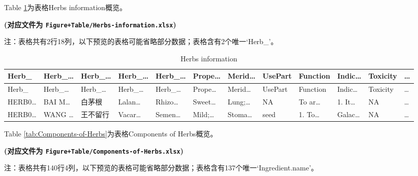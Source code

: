 \documentclass[
]{article}
\begin{document}
Table \ref{tab:Herbs-information}为表格Herbs information概览。

\textbf{(对应文件为 \texttt{Figure+Table/Herbs-information.xlsx})}

\begin{center}\begin{tcolorbox}[colback=gray!10, colframe=gray!50, width=0.9\linewidth, arc=1mm, boxrule=0.5pt]注：表格共有2行18列，以下预览的表格可能省略部分数据；表格含有2个唯一`Herb\_'。
\end{tcolorbox}
\end{center}

\begin{longtable}[]{@{}llllllllllll@{}}
\caption{\label{tab:Herbs-information}Herbs information}\tabularnewline
\toprule
Herb\_ & Herb\_\ldots{} & Herb\_\ldots{} & Herb\_\ldots{} & Herb\_\ldots{} & Prope\ldots{} & Merid\ldots{} & UsePart & Function & Indic\ldots{} & Toxicity & \ldots{}\tabularnewline
\midrule
\endfirsthead
\toprule
Herb\_ & Herb\_\ldots{} & Herb\_\ldots{} & Herb\_\ldots{} & Herb\_\ldots{} & Prope\ldots{} & Merid\ldots{} & UsePart & Function & Indic\ldots{} & Toxicity & \ldots{}\tabularnewline
\midrule
\endhead
HERB0\ldots{} & BAI M\ldots{} & 白茅根 & Lalan\ldots{} & Rhizo\ldots{} & Sweet\ldots{} & Lung;\ldots{} & NA & To ar\ldots{} & 1. It\ldots{} & NA & \ldots{}\tabularnewline
HERB0\ldots{} & WANG \ldots{} & 王不留行 & Vacar\ldots{} & Semen\ldots{} & Mild;\ldots{} & Stoma\ldots{} & seed & 1. To\ldots{} & Galac\ldots{} & NA & \ldots{}\tabularnewline
\bottomrule
\end{longtable}

Table \ref{tab:Components-of-Herbs}为表格Components of Herbs概览。

\textbf{(对应文件为 \texttt{Figure+Table/Components-of-Herbs.xlsx})}

\begin{center}\begin{tcolorbox}[colback=gray!10, colframe=gray!50, width=0.9\linewidth, arc=1mm, boxrule=0.5pt]注：表格共有140行4列，以下预览的表格可能省略部分数据；表格含有137个唯一`Ingredient.name'。
\end{tcolorbox}
\end{center}
\end{document}
